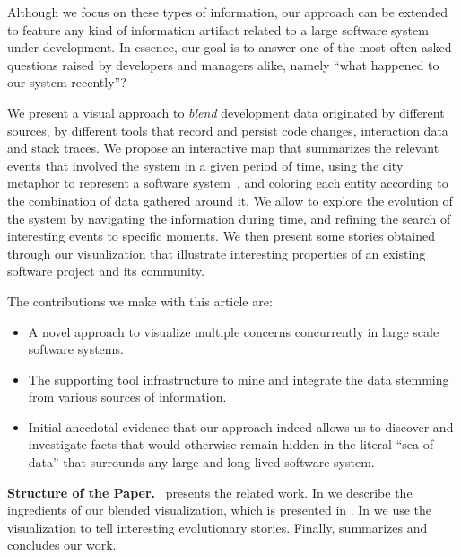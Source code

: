 Although we focus on these types of information, our approach can be extended to feature any kind of information artifact related to a large software system under development. In essence, our goal is to answer one of the most often asked questions raised by developers and managers alike, namely ``what happened to our system recently''?~\cite{Sill2008}

We present a visual approach to \emph{blend} development data originated by different  sources, \eg by different tools that record and persist code changes, interaction data and stack traces. We propose an interactive map that summarizes the relevant events that involved the system in a given period of time, using the city metaphor to represent a software system~\cite{Wett2007}, and coloring each entity according to the combination of data gathered around it. We allow to explore the evolution of the system by navigating the information during time, and refining the search of interesting events to specific moments. We then present some stories obtained through our visualization that illustrate interesting properties of an existing software project and its community.

The contributions we make with this article are:

\begin{itemize}

\item A novel approach to visualize multiple concerns concurrently in large scale software systems.

\item The supporting tool infrastructure to mine and integrate the data stemming from various sources of information.

\item Initial anecdotal evidence that our approach indeed allows us to discover and investigate facts that would otherwise remain hidden in the literal ``sea of data'' that surrounds any large and long-lived software system. 

\end{itemize}

\textbf{Structure of the Paper.}~ presents the related work. In  we describe the ingredients of our blended visualization, which is presented in . In  we use the visualization to tell interesting evolutionary stories. Finally,  summarizes and concludes our work.



